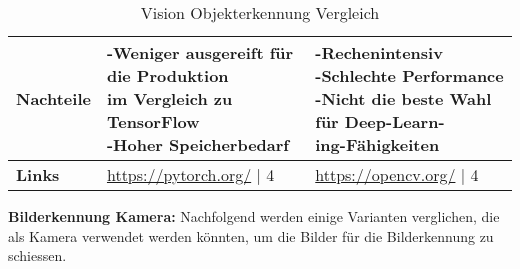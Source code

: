 \begin{table}[H]
\begin{tabularx}{\textwidth}{|l|X|X|}
  \hline
  \textbf{Nachteile} & \makecell{-Weniger ausgereift für die Produktion \\ im Vergleich zu TensorFlow \\ -Hoher Speicherbedarf} & \makecell{-Rechenintensiv \\ -Schlechte Performance \\ -Nicht die beste Wahl für Deep-Learn-\\ing-Fähigkeiten} \\
  \hline
  \textbf{Links} & \url{https://pytorch.org/} | 4  & \url{https://opencv.org/} | 4\\
  \hline
\end{tabularx}
\caption{Vision Objekterkennung Vergleich}
\label{table:vision-object-detection-compare}
\end{table}

\newpage

\textbf{Bilderkennung Kamera:} Nachfolgend werden einige Varianten verglichen, die als Kamera verwendet werden könnten, um die Bilder für die Bilderkennung zu schiessen.

